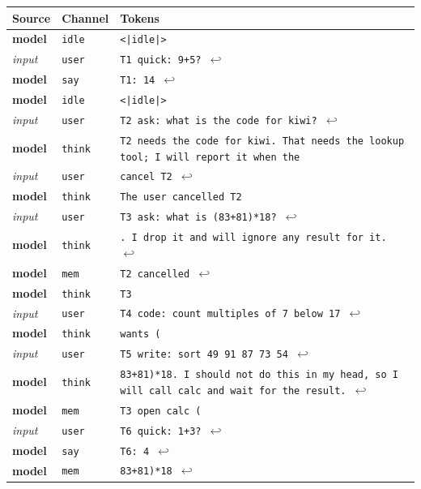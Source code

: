 \begin{tabular}{llp{11.5cm}}
\toprule
Source & Channel & Tokens \\
\midrule
\textbf{model} & \texttt{idle} & \texttt{\textless{}|idle|\textgreater{}} \\
\textit{input} & \texttt{user} & \texttt{T1 quick: 9+5? $\hookleftarrow$} \\
\textbf{model} & \texttt{say} & \texttt{T1: 14 $\hookleftarrow$} \\
\textbf{model} & \texttt{idle} & \texttt{\textless{}|idle|\textgreater{}} \\
\textit{input} & \texttt{user} & \texttt{T2 ask: what is the code for kiwi? $\hookleftarrow$} \\
\textbf{model} & \texttt{think} & \texttt{T2 needs the code for kiwi. That needs the lookup tool; I will report it when the} \\
\textit{input} & \texttt{user} & \texttt{cancel T2 $\hookleftarrow$} \\
\textbf{model} & \texttt{think} & \texttt{The user cancelled T2} \\
\textit{input} & \texttt{user} & \texttt{T3 ask: what is (83+81)*18? $\hookleftarrow$} \\
\textbf{model} & \texttt{think} & \texttt{. I drop it and will ignore any result for it. $\hookleftarrow$} \\
\textbf{model} & \texttt{mem} & \texttt{T2 cancelled $\hookleftarrow$} \\
\textbf{model} & \texttt{think} & \texttt{T3} \\
\textit{input} & \texttt{user} & \texttt{T4 code: count multiples of 7 below 17 $\hookleftarrow$} \\
\textbf{model} & \texttt{think} & \texttt{wants (} \\
\textit{input} & \texttt{user} & \texttt{T5 write: sort 49 91 87 73 54 $\hookleftarrow$} \\
\textbf{model} & \texttt{think} & \texttt{83+81)*18. I should not do this in my head, so I will call calc and wait for the result. $\hookleftarrow$} \\
\textbf{model} & \texttt{mem} & \texttt{T3 open calc (} \\
\textit{input} & \texttt{user} & \texttt{T6 quick: 1+3? $\hookleftarrow$} \\
\textbf{model} & \texttt{say} & \texttt{T6: 4 $\hookleftarrow$} \\
\textbf{model} & \texttt{mem} & \texttt{83+81)*18 $\hookleftarrow$} \\

\end{tabular}
